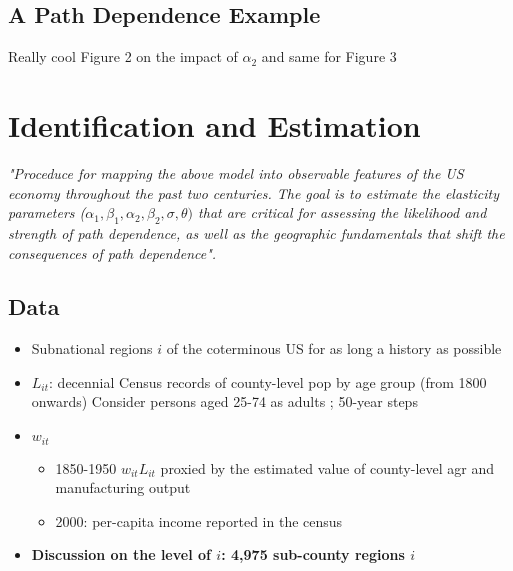 \documentclass[10pt, final]{article}
\begin{document}
\subsection{A Path Dependence Example} %
\label{sub:a_path_dependence_example}

Really cool Figure 2 on the impact of $\alpha_2$ and same for Figure 3







\section{Identification and Estimation} %
\label{sec:identification_and_estimation}

\textit{"Proceduce for mapping the above model into observable features of the US economy throughout the past two centuries. The goal is to estimate the elasticity parameters ($\alpha_1, \beta_1, \alpha_2, \beta_2, \sigma, \theta)$ that are critical for assessing the likelihood and strength of path dependence, as well as the geographic fundamentals that shift the consequences of path dependence".}

\subsection{Data} %
\label{sub:data}
\begin{itemize}
    \item Subnational regions $i$ of the coterminous US for as long a history as possible
    \item $L_{it}$: decennial Census records of county-level pop by age group (from 1800 onwards) Consider persons aged 25-74 as adults ; 50-year steps
    \item $w_{it}$
    \begin{itemize}
        \item 1850-1950 $w_{it} L_{it}$ proxied by the estimated value of county-level agr and manufacturing output
        \item 2000: per-capita income reported in the census
    \end{itemize}
    \item \textbf{Discussion on the level of $i$: 4,975 sub-county regions $i$}
\end{itemize}
\end{document}

